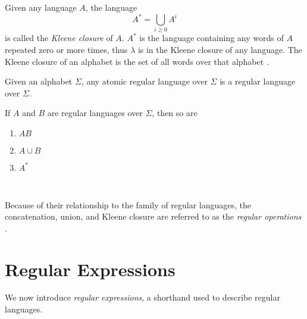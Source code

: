 \documentclass{bcthesis}
\renewcommand{\meo}[1]{}
\newcommand{\footcite}[2]{\xspace\cite[pg.~{#2}]{#1}\xspace}
\begin{document}
		\begin{definition}
			Given any language $A$, the language 
			\[
				A^* = \bigcup_{i \geq 0} A^i
			\]
			is called the \textit{Kleene closure} of $A$.
			$A^*$ is the language containing any words of $A$ repeated zero or more times, thus $\lambda$ is in the Kleene closure of any language.
			The Kleene closure of an alphabet is the set of all words over that alphabet \footcite{lemmings}{3}.
		\end{definition}

		\begin{definition}
			Given an alphabet $\Sigma$, any atomic regular language over $\Sigma$ is a regular language over $\Sigma$.
			
			If $A$ and $B$ are regular languages over $\Sigma$, then so are 
			\begin{enumerate}[label=(\roman*), itemsep = -0.3 ex, nolistsep]
				\item $AB$
				\item $A \cup B$
				\item $A^*$
			\end{enumerate}
			\footcite{rosen}{879}~\meo{todo: something about this citation}
		\end{definition}

		\begin{remark}
			Because of their relationship to the family of regular languages, the concatenation, union, and Kleene closure are referred to as the \textit{regular operations} \footcite{salomaa}{26}.
		\end{remark}

	\clearpage

	\section{Regular Expressions} %
	\label{sec:regular_expressions}

		We now introduce \textit{regular expressions}, a shorthand used to describe regular languages.
\end{document}

